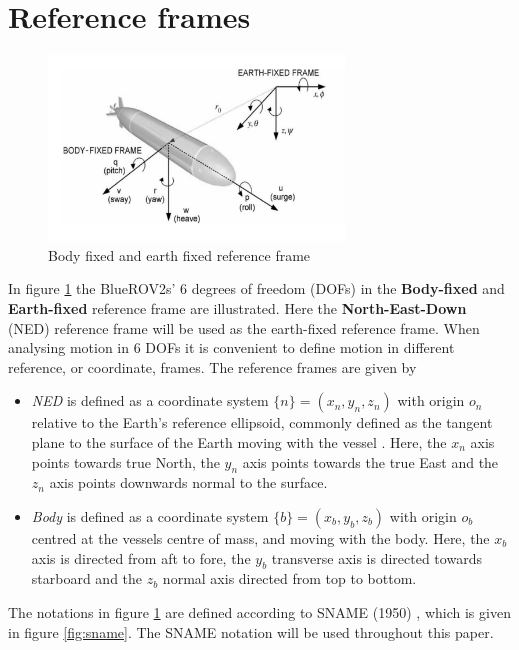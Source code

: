 \section{Reference frames}
\begin{figure}[H]
    \centering
    \includegraphics[width=0.7\textwidth]{images/chap4/reference_frames.png}
    \caption{Body fixed and earth fixed reference frame}
    \label{fig:reference_frame}
\end{figure}
In figure \ref{fig:reference_frame} the BlueROV2s' 6 degrees of freedom (DOFs) in the \textbf{Body-fixed} and \textbf{Earth-fixed} reference frame are illustrated. Here the \textbf{North-East-Down} (NED) reference frame will be used as the earth-fixed reference frame. When analysing motion in 6 DOFs it is convenient to define motion in different reference, or coordinate, frames. The reference frames are given by
\begin{itemize}
    \item \textit{NED} is defined as a coordinate system $\{n\} = (x_{n},y_{n},z_{n})$ with origin $o_{n}$ relative to the Earth's reference ellipsoid, commonly defined as the tangent plane to the surface of the Earth moving with the vessel \cite{Fossen}. Here, the $x_{n}$ axis points towards true North, the $y_{n}$ axis points towards the true East and the $z_{n}$ axis points downwards normal to the surface. 
    \item \textit{Body} is defined as a coordinate system $\{b\} = (x_{b},y_{b},z_{b})$ with origin $o_{b}$ centred at the vessels centre of mass, and moving with the body. Here, the $x_{b}$ axis is directed from aft to fore, the $y_{b}$ transverse axis is directed towards starboard and the $z_{b}$ normal axis directed from top to bottom. 
\end{itemize}
The notations in figure \ref{fig:reference_frame} are defined according to SNAME (1950) \cite{Fossen}, which is given in figure \ref{fig:sname}. The SNAME notation will be used throughout this paper. 
